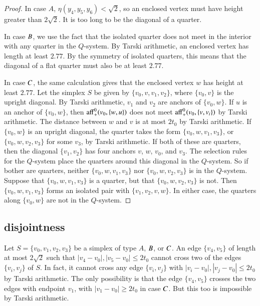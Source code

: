 
\begin{proof}
In case $A$, $\eta(y_4,y_5,y_6)<\sqrt{2}$, so an enclosed vertex
must have height greater than $2\sqrt{2}$.  It is too long to be
the diagonal of a quarter.

In case $B$, we use the fact that the isolated quarter does not
meet in the interior with any quarter in the $Q$-system. 
By Tarski arithmetic, an
enclosed vertex has length at least $2.77$.
By the symmetry of isolated quarters, this means that the diagonal
of a flat quarter must also be at least $2.77$.

In case $C$, the same calculation gives that the enclosed vertex
$w$ has height at least $2.77$.  Let the simplex $S$ be given by
$\{v_0,v,v_1,v_2\}$, where $\{v_0,v\}$ is the upright diagonal. By
Tarski arithmetic, $v_1$ and $v_2$ are anchors of
$\{v_0,w\}$. If $u$ is an anchor of $\{v_0,w\}$, then ${\operatorname{aff}}_+^0(v_0,\{w,u\})$
does not meet ${\operatorname{aff}}_+^0(v_0,\{v,v_i\})$ by
Tarski arithmetic. 
The distance between $w$ and $v$ is at most
$2t_0$ by Tarski arithmetic. If $\{v_0,w\}$ is 
an upright diagonal, the quarter takes the form
$\{v_0,w,v_1,v_3\}$, or $\{v_0,w,v_2,v_3\}$ for some $v_3$, by
Tarski arithmetic. If both of these are quarters, then
the diagonal $\{v_1,v_2\}$ has four anchors $v$, $w$, $v_0$, and
$v_3$. The selection rules for the $Q$-system place the quarters
around this diagonal in the $Q$-system. So if bother are quarters, neither $\{v_0,w,v_1,v_3\}$
nor $\{v_0,w,v_2,v_3\}$ is in the $Q$-system. Suppose that
$\{v_0,w,v_1,v_3\}$ is a quarter, but that $\{v_0,w,v_2,v_3\}$ is not.
Then $\{v_0,w,v_1,v_3\}$ forms an isolated pair with $\{v_1,v_2,v,w\}$.
In either case, the quarters along $\{v_0,w\}$ are not in the
$Q$-system.
\end{proof}

%

\subsection{disjointness}%

Let $S=\{v_0,v_1,v_2,v_3\}$ be a simplex of type $A$, $B$, or
$C$. An edge $\{v_4,v_5\}$ of length at most $2\sqrt{2}$ such
that $|v_4-v_0|,|v_5-v_0|\le 2t_0$ cannot cross two of the edges
$\{v_i,v_j\}$ of $S$.  In fact, it cannot cross any edge $\{v_i,v_j\}$
with $|v_i-v_0|,|v_j-v_0|\le 2t_0$ by Tarski arithmetic.  The
only possibility is that the edge $\{v_4,v_5\}$ crosses the two
edges with endpoint $v_1$, with $|v_1-v_0|\ge2t_0$ in case $C$.  But
this too is impossible by Tarski arithmetic.

